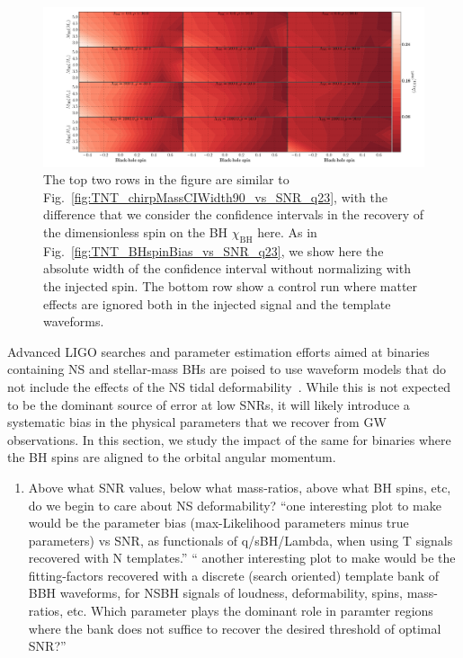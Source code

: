 \documentclass[aps,prd,amsmath,floats,floatfix, twocolumn,
superscriptaddress,nofootinbib,showpacs]{revtex4-1}
\begin{document}
% 
\begin{figure}
\centering    
\includegraphics[trim={{0.4\columnwidth} 0 0 0},width=2.2\columnwidth]{plots-TN/TN_ChiBHCIWidths90_0_Lambda_SNR.pdf}
\caption{The top two rows in the figure are similar to
Fig.~\ref{fig:TNT_chirpMassCIWidth90_vs_SNR_q23},
with the difference that we consider the confidence intervals in the recovery
of the dimensionless spin on the BH $\chi_\mathrm{BH}$ here.
As in Fig.~\ref{fig:TNT_BHspinBias_vs_SNR_q23}, we show here the absolute 
width of the confidence interval without normalizing with the injected spin.
The bottom row show a control run where matter effects are ignored both 
in the injected signal and the template waveforms.}
\label{fig:TNT_BHspinCIWidth90_vs_SNR_q23}
\end{figure}
% 
% 
Advanced LIGO searches and parameter estimation efforts aimed at binaries 
containing NS and stellar-mass BHs are poised to use waveform models that do not
include the effects of the NS tidal deformability~\cite{Canton:2014ena}.
While this is not expected to
be the dominant source of error at low SNRs, it will likely introduce a
systematic bias in the physical parameters that we recover from GW observations.
In this section, we study the impact of the same for binaries where the BH spins
are aligned to the orbital angular momentum.

\begin{enumerate}
\item Above what SNR values, below what mass-ratios, above what BH spins, etc, 
do we begin to care about NS deformability?\newline
``one interesting plot to make would be the parameter bias (max-Likelihood
parameters minus true parameters) vs SNR, as functionals of q/sBH/Lambda, when
using T signals recovered with N templates.''\newline
`` another interesting plot to make would be the fitting-factors recovered with
a discrete (search oriented) template bank of BBH waveforms, for NSBH signals of
loudness, deformability, spins, mass-ratios, etc. Which parameter plays the 
dominant role in paramter regions where the bank does not suffice to recover
the desired threshold of optimal SNR?''
\end{enumerate}
\end{document}
